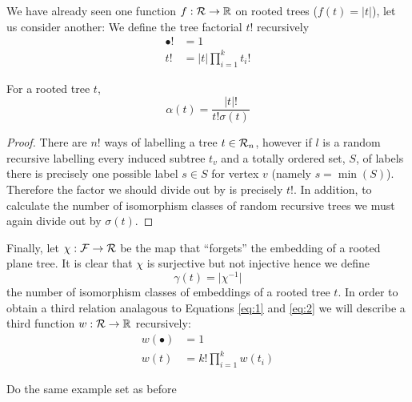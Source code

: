 
We have already seen one function $f: \operatorname{\mathcal{R}} \rightarrow \mathbb{R}$ on rooted trees ($f(t) = \lvert t \rvert$), let us consider 
another: We define the tree factorial $t!$ recursively
\begin{align}
 \bullet! &=  1  \\
 t ! &= \lvert t \rvert \prod_{i=1}^k t_i !
\end{align}

\begin{ex}
\end{ex}

\begin{lem}\label{lem:alpha}
For a rooted tree $t$,
 \begin{equation}\label{eq:2}
\alpha(t) = \frac{\lvert t \rvert !}{t!\sigma(t)}
 \end{equation}
\end{lem}


\begin{proof}
 There are $n!$ ways of labelling a tree $t \in \operatorname{\mathcal{R}}_n$, however if $l$ is a random recursive labelling every induced subtree 
 $t_v$ and a totally ordered set, $S$, of labels there is precisely one possible label $s \in S$ for vertex $v$ (namely $s = \min(S)$).  
 Therefore the factor we should divide out by is precisely $t!$.  In addition, to calculate the number of isomorphism classes of 
 random recursive trees we must again divide out by $\sigma(t)$.
\end{proof}

Finally, let $\chi: \operatorname{\mathcal{F}} \rightarrow \operatorname{\mathcal{R}}$ be the map that ``forgets'' the embedding of a rooted plane tree.  It is clear that $\chi$ 
is surjective but not injective hence we define
\[
 \gamma(t) = \lvert \chi^{-1} \rvert 
\]
the number of isomorphism classes of embeddings of a rooted tree $t$.  In order to obtain a third relation analagous to Equations 
\ref{eq:1} and \ref{eq:2} we will describe a third function $w: \operatorname{\mathcal{R}} \rightarrow \mathbb{R}$ recursively:
\begin{align}
 w(\bullet) &= 1  \\ 
 w(t)  &= k!\prod_{i=1}^{k}w(t_i) 
\end{align}
\begin{ex}
 Do the same example set as before
\end{ex}

